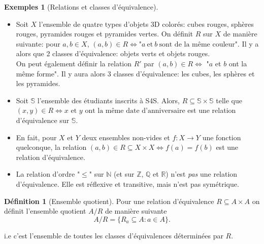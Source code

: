 \documentclass[oneside,12pt,french,table]{book}
\newcommand{\N}{\mathbb{N}}
\newcommand{\Z}{\mathbb{Z}}
\newcommand{\Q}{\mathbb{Q}}
\newcommand{\R}{\mathbb{R}}
\theoremstyle{definition}
\theoremstyle{definition}
\newtheorem*{examples}{Exemples}
\theoremstyle{definition}
\newtheorem{definition}{Définition}[chapter]
\begin{document}
\begin{examples}[Relations et classes d'équivalence] \hspace{1em} \\
\begin{itemize}
\item Soit $X$ l'ensemble de quatre types d'objets 3D colorés: cubes rouges, sphères rouges, pyramides rouges et pyramides vertes. On définit $R$ sur $X$ de manière suivante: pour $a,b \in X$, $(a,b)\in R \iff \text{"}a \ \text{et} \ b \ \text{sont de la même couleur"}$. Il y a alors que 2 classes d'équivalence: objets verts et objets rouges. \\
On peut également définir la relation $R'$ par $(a,b) \in R \iff$ "$a$ et $b$ ont la même forme". Il y aura alors 3 classes d'équivalence: les cubes, les sphères et les pyramides. \\
\item Soit $\mathbb{S}$ l'ensemble des étudiants inscrits à S4S. Alors, $R \subseteq \mathbb{S} \times \mathbb{S}$ telle que $(x,y)\in R \iff x \text{ et } y \text{ ont la même date d'anniversaire}$ est une relation d'équivalence sur $\mathbb{S}$. \\
\item En fait, pour $X$ et $Y$ deux ensembles non-vides et $f: X \longrightarrow Y$ une fonction quelconque, la relation $(a,b) \in R \subseteq X \times X \iff f(a) = f(b)$ est une relation d'équivalence. \\
\item La relation d'ordre "$\leq$" sur $\N$ (et sur $\Z$, $\Q$ et $\R$) n'est \textit{pas} une relation d'équivalence. Elle est réflexive et transitive, mais n'est pas symétrique.
\end{itemize}
\end{examples}

\begin{definition}[Ensemble quotient]
Pour  une relation d'équivalence $R\subseteq A\times A$ on définit l'ensemble quotient $A/R$ de manière suivante
\[
	A/R=\{R_a\subseteq A: a\in A\}.
\]

i.e c'est l'ensemble de toutes les classes d'équivalences déterminées par $R$.
\end{definition}
\end{document}
